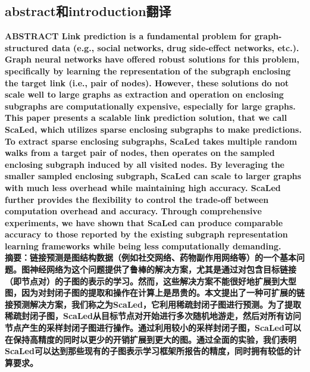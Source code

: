 \documentclass{article}
\begin{document}
\subsection*{abstract和introduction翻译}
\textbf{ABSTRACT
Link prediction is a fundamental problem for graph-structured data
(e.g., social networks, drug side-effect networks, etc.). Graph neural
networks have offered robust solutions for this problem, specifically by learning the representation of the subgraph enclosing the
target link (i.e., pair of nodes). However, these solutions do not
scale well to large graphs as extraction and operation on enclosing subgraphs are computationally expensive, especially for large
graphs. This paper presents a scalable link prediction solution, that
we call ScaLed, which utilizes sparse enclosing subgraphs to make
predictions. To extract sparse enclosing subgraphs, ScaLed takes
multiple random walks from a target pair of nodes, then operates
on the sampled enclosing subgraph induced by all visited nodes.
By leveraging the smaller sampled enclosing subgraph, ScaLed
can scale to larger graphs with much less overhead while maintaining high accuracy. ScaLed further provides the flexibility to
control the trade-off between computation overhead and accuracy.
Through comprehensive experiments, we have shown that ScaLed
can produce comparable accuracy to those reported by the existing subgraph representation learning frameworks while being less
computationally demanding.}\\

\textbf{摘要：链接预测是图结构数据（例如社交网络、药物副作用网络等）的一个基本问题。图神经网络为这个问题提供了鲁棒的解决方案，尤其是通过对包含目标链接（即节点对）的子图的表示的学习。然而，这些解决方案不能很好地扩展到大型图，因为对封闭子图的提取和操作在计算上是昂贵的。本文提出了一种可扩展的链接预测解决方案，我们称之为ScaLed，它利用稀疏封闭子图进行预测。为了提取稀疏封闭子图，ScaLed从目标节点对开始进行多次随机地游走，然后对所有访问节点产生的采样封闭子图进行操作。通过利用较小的采样封闭子图，ScaLed可以在保持高精度的同时以更少的开销扩展到更大的图。通过全面的实验，我们表明ScaLed可以达到那些现有的子图表示学习框架所报告的精度，同时拥有较低的计算要求。}\\
\end{document}
